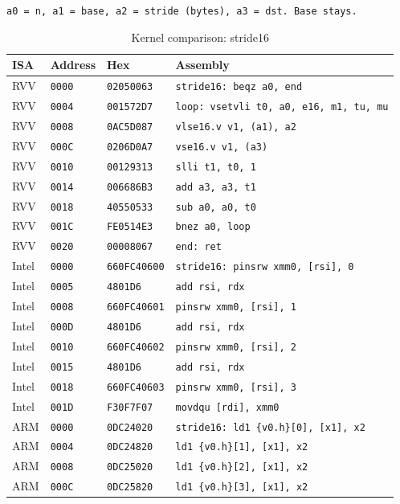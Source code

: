 \begin{table}[htbp]
\centering
\caption{Kernel comparison: stride16}
\begingroup
\scriptsize
\setlength{\tabcolsep}{4pt}
\noindent \texttt{a0 = n, a1 = base, a2 = stride (bytes), a3 = dst. Base stays.}\par
\vspace{0.6ex}
\begin{tabular}{@{}l|l|l|p{7.2cm}@{}}
\toprule
ISA & Address & Hex & Assembly \\
\midrule
RVV & \texttt{0000} & \texttt{02050063} & \texttt{stride16: beqz a0, end} \\
RVV & \texttt{0004} & \texttt{001572D7} & \texttt{loop: vsetvli t0, a0, e16, m1, tu, mu} \\
RVV & \texttt{0008} & \texttt{0AC5D087} & \texttt{vlse16.v v1, (a1), a2} \\
RVV & \texttt{000C} & \texttt{0206D0A7} & \texttt{vse16.v v1, (a3)} \\
RVV & \texttt{0010} & \texttt{00129313} & \texttt{slli t1, t0, 1} \\
RVV & \texttt{0014} & \texttt{006686B3} & \texttt{add a3, a3, t1} \\
RVV & \texttt{0018} & \texttt{40550533} & \texttt{sub a0, a0, t0} \\
RVV & \texttt{001C} & \texttt{FE0514E3} & \texttt{bnez a0, loop} \\
RVV & \texttt{0020} & \texttt{00008067} & \texttt{end: ret} \\
\midrule
Intel & \texttt{0000} & \texttt{660FC40600} & \texttt{stride16: pinsrw xmm0, [rsi], 0} \\
Intel & \texttt{0005} & \texttt{4801D6} & \texttt{add rsi, rdx} \\
Intel & \texttt{0008} & \texttt{660FC40601} & \texttt{pinsrw xmm0, [rsi], 1} \\
Intel & \texttt{000D} & \texttt{4801D6} & \texttt{add rsi, rdx} \\
Intel & \texttt{0010} & \texttt{660FC40602} & \texttt{pinsrw xmm0, [rsi], 2} \\
Intel & \texttt{0015} & \texttt{4801D6} & \texttt{add rsi, rdx} \\
Intel & \texttt{0018} & \texttt{660FC40603} & \texttt{pinsrw xmm0, [rsi], 3} \\
Intel & \texttt{001D} & \texttt{F30F7F07} & \texttt{movdqu [rdi], xmm0} \\
\midrule
ARM & \texttt{0000} & \texttt{0DC24020} & \texttt{stride16: ld1 \{v0.h\}[0], [x1], x2} \\
ARM & \texttt{0004} & \texttt{0DC24820} & \texttt{ld1 \{v0.h\}[1], [x1], x2} \\
ARM & \texttt{0008} & \texttt{0DC25020} & \texttt{ld1 \{v0.h\}[2], [x1], x2} \\
ARM & \texttt{000C} & \texttt{0DC25820} & \texttt{ld1 \{v0.h\}[3], [x1], x2} \\
\bottomrule
\end{tabular}
\endgroup
\end{table}
\noindent{}\par
